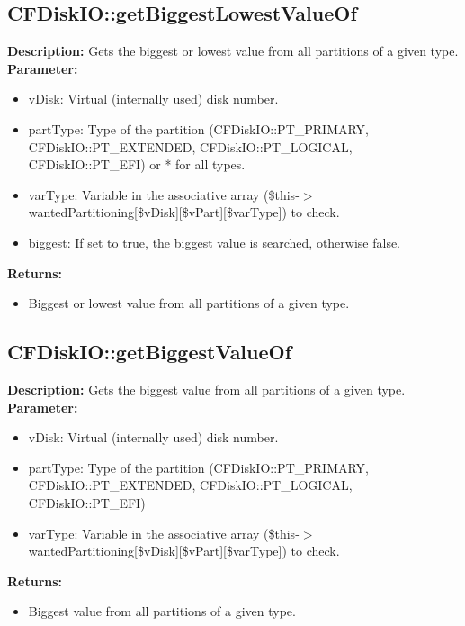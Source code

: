 \subsection{CFDiskIO::getBiggestLowestValueOf}
\textbf{Description:} Gets the biggest or lowest value from all partitions of a given type.\\
\textbf{Parameter:}
\begin{itemize}
\item vDisk: Virtual (internally used) disk number.
\item partType: Type of the partition (CFDiskIO::PT\_PRIMARY, CFDiskIO::PT\_EXTENDED, CFDiskIO::PT\_LOGICAL, CFDiskIO::PT\_EFI) or * for all types.
\item varType: Variable in the associative array (\$this-$>$wantedPartitioning[\$vDisk][\$vPart][\$varType]) to check.
\item biggest: If set to true, the biggest value is searched, otherwise false.
\end{itemize}
\textbf{Returns:}
\begin{itemize}
\item Biggest or lowest value from all partitions of a given type.
\end{itemize}

\subsection{CFDiskIO::getBiggestValueOf}
\textbf{Description:} Gets the biggest value from all partitions of a given type.\\
\textbf{Parameter:}
\begin{itemize}
\item vDisk: Virtual (internally used) disk number.
\item partType: Type of the partition (CFDiskIO::PT\_PRIMARY, CFDiskIO::PT\_EXTENDED, CFDiskIO::PT\_LOGICAL, CFDiskIO::PT\_EFI)
\item varType: Variable in the associative array (\$this-$>$wantedPartitioning[\$vDisk][\$vPart][\$varType]) to check.
\end{itemize}
\textbf{Returns:}
\begin{itemize}
\item Biggest value from all partitions of a given type.
\end{itemize}

